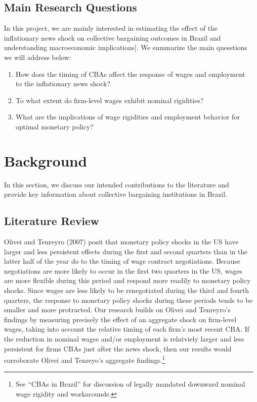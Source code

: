 \documentclass[12pt]{article}
\begin{document}
		\subsection{Main Research Questions}
		In this project, we are mainly interested in estimating the effect of the inflationary news shock on collective bargaining outcomes in Brazil and understanding macroeconomic implications]. We summarize the main quesstions we will address below:  
		\begin{enumerate}
			\item How does the timing of CBAs affect the response of wages and employment to the inflationary news shock?

			\item To what extent do firm-level wages exhibit nominal rigidities?

			\item What are the implications of wage rigidities and employment behavior for optimal monetary policy?
		\end{enumerate}
	\section{Background}
	In this section, we discuss our intended contributions to the literature and provide key information about collective bargaining institutions in Brazil.
		\subsection{Literature Review}
		Olivei and Tenreyro (2007) posit that monetary policy shocks in the US have larger and less persistent effects during the first and second quarters than in the latter half of the year do to the timing of wage contract negotiations. Because negotiations are more likely to occur in the first two quarters in the US, wages are more flexible during this period and respond more readily to monetary policy shocks. Since wages are less likely to be renegotiated during the third and fourth quarters, the response to monetary policy shocks during these periods tends to be smaller and more protracted. Our research builds on Olivei and Tenreyro's findings by measuring precisely the effect of an aggregate shock on firm-level wages, taking into account the relative timing of each firm's most recent CBA. If the reduction in nominal wages and/or employment is relatviely larger and less persistent for firms CBAs just after the news shock, then our results would corroborate Olivei and Tenreyo's aggregate findings.\footnote{See ``CBAs in Brazil'' for discussion of legally mandated downward nominal wage rigidity and workarounds.}
\end{document}

